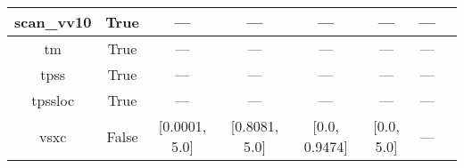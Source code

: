 \begin{tabular}{|c|c|c|c|c|c|c|l|}
   scan\_vv10 &                  True &              --- &              --- &              --- &            --- &        --- &                                                      \cite{Brandenburg2016_115144} \\ \hline
           tm &                  True &              --- &              --- &              --- &            --- &        --- &                                                              \cite{Tao2016_073001} \\ \hline
         tpss &                  True &              --- &              --- &              --- &            --- &        --- &                                              \cite{Tao2003_146401,Perdew2004_6898} \\ \hline
      tpssloc &                  True &              --- &              --- &              --- &            --- &        --- &                                                       \cite{Constantin2012_035130} \\ \hline
         vsxc &                 False &    [0.0001, 5.0] &    [0.8081, 5.0] &    [0.0, 0.9474] &     [0.0, 5.0] &        --- &                                                          \cite{VanVoorhis1998_400} \\ \hline
\end{tabular}